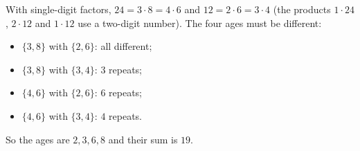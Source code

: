 With single-digit factors, $24=3\cdot8=4\cdot6$ and $12=2\cdot6=3\cdot4$ (the products $1\cdot24$, $2\cdot12$ and $1\cdot12$ use a two-digit number). The four ages must be different:
\begin{itemize}
\item $\{3,8\}$ with $\{2,6\}$: all different;
\item $\{3,8\}$ with $\{3,4\}$: $3$ repeats;
\item $\{4,6\}$ with $\{2,6\}$: $6$ repeats;
\item $\{4,6\}$ with $\{3,4\}$: $4$ repeats.
\end{itemize}
So the ages are $2,3,6,8$ and their sum is $\boxed{19}$.
